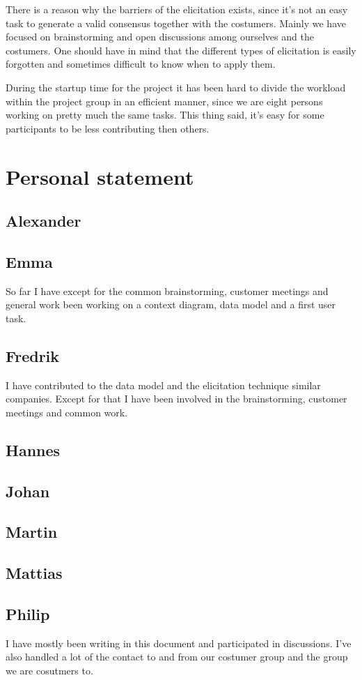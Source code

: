 \documentclass[a4paper]{article}
\begin{document}
	There is a reason why the barriers of the elicitation exists, since it's not an easy task to generate a valid consensus together with the costumers.
	Mainly we have focused on brainstorming and open discussions among ourselves and the costumers. One should have in mind that the different types of elicitation is easily forgotten and sometimes difficult to know when to apply them.
  
 	During the startup time for the project it has been hard to divide the workload within the project group in an efficient manner, since we are eight persons working on pretty much the same tasks. This thing said, it's easy for some participants to be less contributing then others.



  \section{Personal statement}
  
  \subsection{Alexander}
  \subsection{Emma}
	So far I have except for the common brainstorming, customer meetings and general work been working on a context diagram, data model and a first user task.	
  \subsection{Fredrik}
  	I have contributed to the data model and the elicitation technique similar companies. Except for that I have been involved in the brainstorming, customer meetings and common work. 
  \subsection{Hannes}
  \subsection{Johan}
  \subsection{Martin}
  \subsection{Mattias}
  \subsection{Philip}
  I have mostly been writing in this document and participated in discussions. 
  I've also handled a lot of the contact to and from our costumer group and the group we are cosutmers to.
\end{document}

